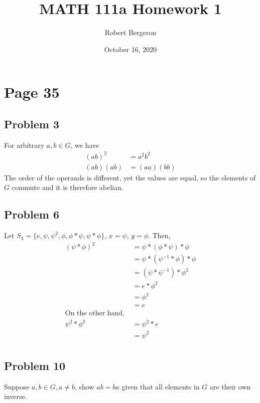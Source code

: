 \documentclass{article}
\title{MATH 111a Homework 1}
\author{Robert Bergeron}
\date{October 16, 2020}
\begin{document}
\maketitle

\section*{Page 35}

\subsection*{Problem 3}
    For arbitrary \(a,b \in G\), we have
    \begin{align*}
        (ab)^2 & = a^2b^2 \\
        (ab) (ab) & = (aa) (bb)
    \end{align*}
    The order of the operands is different, yet the values are equal, so the elements
    of \(G\) commute and it is therefore abelian.

\subsection*{Problem 6}
    Let \(S_3 = \{e, \psi, \psi^2, \phi, \phi*\psi, \psi*\phi\}\), \(x = \psi\),
    \(y = \phi\). Then,
    \begin{align*}
        (\psi*\phi)^2 & = \psi*(\phi*\psi)*\phi \\
                      & = \psi*(\psi^{-1}*\phi)*\phi \\
                      & = (\psi*\psi^{-1})*\phi^2 \\
                      & = e*\phi^2 \\
                      & = \phi^2 \\
                      & = e \\
                      \text{On the other hand, } \\
        \psi^2*\phi^2 & = \psi^2*e \\
                      & = \psi^2 \\
    \end{align*}

\subsection*{Problem 10}
    Suppose \(a,b \in G, a \ne b\), show \(ab = ba\)
    given that all elements in \(G\) are their own inverse. \\
\end{document}
